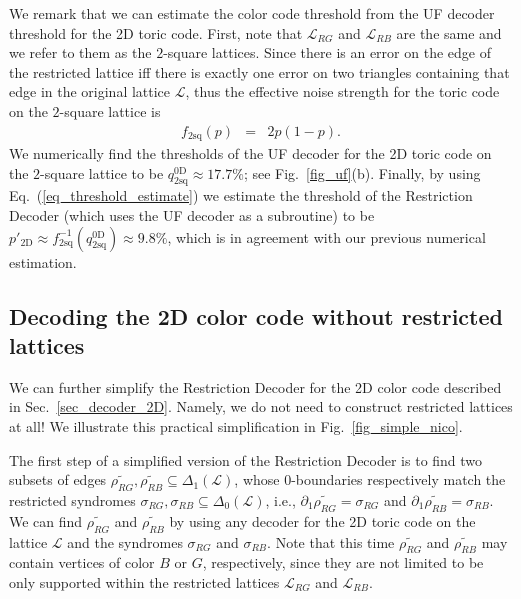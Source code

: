 \documentclass[onecolumn,letterpaper,11pt,accepted=2022-12-19]{quantumarticle}
\newcommand{\face}[2]{{\Delta_{#1}(#2)}}
\newcommand{\psqoctUF}{9.8\%}
\theoremstyle{definition}
\theoremstyle{lemma}
\theoremstyle{theorem}
\theoremstyle{corollary}
\begin{document}
{We remark that we can estimate the color code threshold from the UF decoder threshold for the 2D toric code.
First, note that $\mathcal{L}_{RG}$ and $\mathcal{L}_{RB}$ are the same and we refer to them as the $2$-square lattices.
Since there is an error on the edge of the restricted lattice iff there is exactly one error on two triangles containing that edge in the original lattice $\mathcal{L}$, thus the effective noise strength for the toric code on the $2$-square lattice is
\begin{eqnarray}
f_{2\textrm{sq}}(p) &=& 2p(1-p).
\end{eqnarray}
We numerically find the thresholds of the UF decoder for the 2D toric code on the $2$-square lattice to be $q^{\textrm{0D}}_{2\textrm{sq}} \approx 17.7\%$; see Fig.~\ref{fig_uf}(b).
Finally, by using Eq.~(\ref{eq_threshold_estimate}) we estimate the threshold of the Restriction Decoder (which uses the UF decoder as a subroutine) to be $p'_{\textrm{2D}} \approx f^{-1}_{2\textrm{sq}}(q^{\textrm{0D}}_{2\textrm{sq}} )\approx \psqoctUF$, which is in agreement with our previous numerical estimation.


\subsection{Decoding the 2D color code without restricted lattices}
\label{sec_simplified_2D}



We can further simplify the Restriction Decoder for the 2D color code described in Sec.~\ref{sec_decoder_2D}.
Namely, we do not need to construct restricted lattices at all!
We illustrate this practical simplification in Fig.~\ref{fig_simple_nico}.


The first step of a simplified version of the Restriction Decoder is to find two subsets of edges $\widetilde{\rho_{RG}}, \widetilde{\rho_{RB}} \subseteq \face 1 {\mathcal{L}}$, whose $0$-boundaries respectively match the restricted syndromes $\sigma_{RG},\sigma_{RB}\subseteq \face 0 {\mathcal{L}}$, i.e., $\partial_1 \widetilde{\rho_{RG}} = \sigma_{RG}$ and $\partial_1 \widetilde{\rho_{RB}} = \sigma_{RB}$.
We can find $\widetilde{\rho_{RG}}$ and $\widetilde{\rho_{RB}}$ by using any decoder for the 2D toric code on the lattice $\mathcal{L}$ and the syndromes $\sigma_{RG}$ and $\sigma_{RB}$.
Note that this time $\widetilde{\rho_{RG}}$ and $\widetilde{\rho_{RB}}$ may contain vertices of color $B$ or $G$, respectively, since they are not limited to be only supported within the restricted lattices $\mathcal{L}_{RG}$ and $\mathcal{L}_{RB}$.


}
\end{document}
